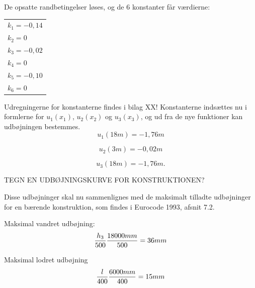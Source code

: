 De opsatte randbetingelser løses, og de 6 konstanter får værdierne: 

\begin{table}[h]
	\begin{tabular}{l}
		$k_1 = -0,\!14$       \\
		$k_2 = 0$             \\
		$k_3 = -0,\!02$       \\
		$k_4 = 0$             \\
		$k_5 = -0,\!10$       \\
		$k_6 = 0$             \\ 
	\end{tabular}
\end{table}

Udregningerne for konstanterne findes i bilag XX!
\newline
\newline 
Konstanterne indsættes nu i formlerne for $u_1(x_1)$, $u_2(x_2)$ og $u_3(x_3)$, og ud fra de nye funktioner kan udbøjningen bestemmes.
\begin{equation}
u_1(18m) = -1,\!76 m
\end{equation}

\begin{equation}
u_2(3m) = -0,\!02 m
\end{equation}

\begin{equation}
u_3(18m) = -1,\!76 m.   
\end{equation}

TEGN EN UDBØJNINGSKURVE FOR KONSTRUKTIONEN? 

Disse udbøjninger skal nu sammenlignes med de maksimalt tilladte udbøjninger for en bærende konstruktion, som findes i Eurocode 1993, afsnit 7.2. 

Maksimal vandret udbøjning: 
\begin{equation}
\frac{h_3}{500}
\\
\frac{18000mm}{500} = 36 mm
\end{equation}

Maksimal lodret udbøjning
\begin{equation}
\frac{l}{400}
\\
\frac{6000mm}{400} = 15 mm
\end{equation}
